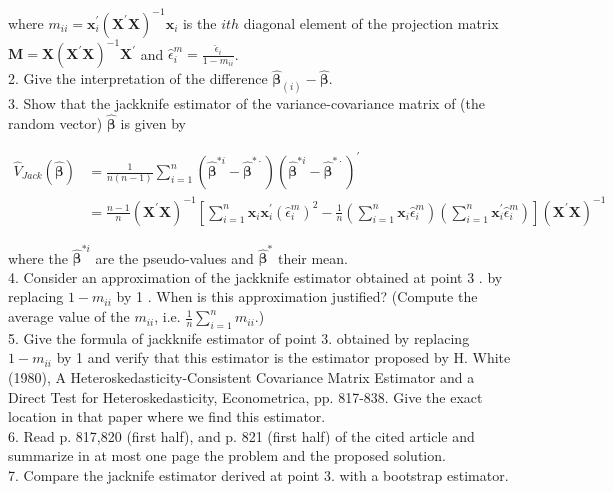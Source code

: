 where $m_{i i}=\mathbf{x}_{i}^{\prime}\left(\mathbf{X}^{\prime} \mathbf{X}\right)^{-1} \mathbf{x}_{i}$ is the $i t h$ diagonal element of the projection matrix $\mathbf{M}=\mathbf{X}\left(\mathbf{X}^{\prime} \mathbf{X}\right)^{-1} \mathbf{X}^{\prime}$ and $\hat{\epsilon}_{i}^{m}=\frac{\hat{\epsilon}_{i}}{1-m_{i i}}$.\\
2. Give the interpretation of the difference $\hat{\boldsymbol{\beta}}_{(i)}-\hat{\boldsymbol{\beta}}$.\\
3. Show that the jackknife estimator of the variance-covariance matrix of (the random vector) $\hat{\boldsymbol{\beta}}$ is given by

$$
\begin{aligned}
\hat{V}_{J a c k}(\hat{\boldsymbol{\beta}}) & =\frac{1}{n(n-1)} \sum_{i=1}^{n}\left(\hat{\boldsymbol{\beta}}^{* i}-\hat{\boldsymbol{\beta}}^{* \cdot}\right)\left(\hat{\boldsymbol{\beta}}^{* i}-\hat{\boldsymbol{\beta}}^{* \cdot}\right)^{\prime} \\
& =\frac{n-1}{n}\left(\mathbf{X}^{\prime} \mathbf{X}\right)^{-1}\left[\sum_{i=1}^{n} \mathbf{x}_{i} \mathbf{x}_{i}^{\prime}\left(\hat{\epsilon}_{i}^{m}\right)^{2}-\frac{1}{n}\left(\sum_{i=1}^{n} \mathbf{x}_{i} \hat{\epsilon}_{i}^{m}\right)\left(\sum_{i=1}^{n} \mathbf{x}_{i}^{\prime} \hat{\epsilon}_{i}^{m}\right)\right]\left(\mathbf{X}^{\prime} \mathbf{X}\right)^{-1}
\end{aligned}
$$

where the $\hat{\boldsymbol{\beta}}^{* i}$ are the pseudo-values and $\hat{\boldsymbol{\beta}}^{*}$ their mean.\\
4. Consider an approximation of the jackknife estimator obtained at point 3 . by replacing $1-m_{i i}$ by 1 . When is this approximation justified? (Compute the average value of the $m_{i i}$, i.e. $\frac{1}{n} \sum_{i=1}^{n} m_{i i}$.)\\
5. Give the formula of jackknife estimator of point 3. obtained by replacing $1-m_{i i}$ by 1 and verify that this estimator is the estimator proposed by H. White (1980), A Heteroskedasticity-Consistent Covariance Matrix Estimator and a Direct Test for Heteroskedasticity, Econometrica, pp. 817-838. Give the exact location in that paper where we find this estimator.\\
6. Read p. 817,820 (first half), and p. 821 (first half) of the cited article and summarize in at most one page the problem and the proposed solution.\\
7. Compare the jacknife estimator derived at point 3. with a bootstrap estimator.